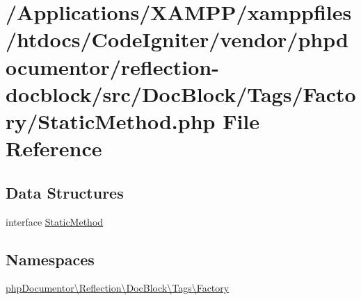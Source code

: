 \hypertarget{_static_method_8php}{}\section{/\+Applications/\+X\+A\+M\+P\+P/xamppfiles/htdocs/\+Code\+Igniter/vendor/phpdocumentor/reflection-\/docblock/src/\+Doc\+Block/\+Tags/\+Factory/\+Static\+Method.php File Reference}
\label{_static_method_8php}
\subsection*{Data Structures}
\begin{DoxyCompactItemize}
\item 
interface \mbox{\hyperlink{interfacephp_documentor_1_1_reflection_1_1_doc_block_1_1_tags_1_1_factory_1_1_static_method}{Static\+Method}}
\end{DoxyCompactItemize}
\subsection*{Namespaces}
\begin{DoxyCompactItemize}
\item 
 \mbox{\hyperlink{namespacephp_documentor_1_1_reflection_1_1_doc_block_1_1_tags_1_1_factory}{php\+Documentor\textbackslash{}\+Reflection\textbackslash{}\+Doc\+Block\textbackslash{}\+Tags\textbackslash{}\+Factory}}
\end{DoxyCompactItemize}
